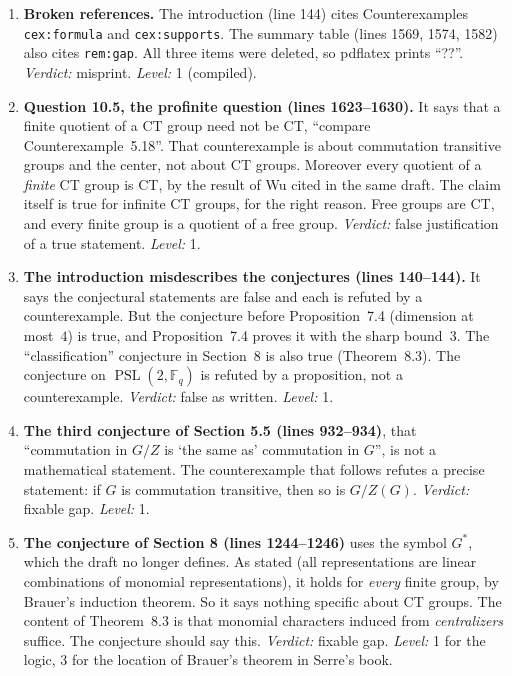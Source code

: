 \documentclass[12pt,letterpaper]{article}
\newcommand{\F}{\mathbb{F}}
\DeclareMathOperator{\PSL}{PSL}
\begin{document}
\begin{enumerate}[label=\textbf{C\arabic*.},leftmargin=*,itemsep=4pt]
\item \textbf{Broken references.} The introduction (line 144) cites
  Counterexamples \verb|cex:formula| and \verb|cex:supports|. The summary
  table (lines 1569, 1574, 1582) also cites \verb|rem:gap|. All three items
  were deleted, so pdflatex prints ``??''. \emph{Verdict:} misprint.
  \emph{Level:} 1 (compiled).

\item \textbf{Question 10.5, the profinite question (lines 1623--1630).} It
  says that a finite quotient of a CT group need not be CT, ``compare
  Counterexample~5.18''. That counterexample is about commutation transitive
  groups and the center, not about CT groups. Moreover every quotient of a
  \emph{finite} CT group is CT, by the result of Wu cited in the same draft.
  The claim itself is true for infinite CT groups, for the right reason.
  Free groups are CT, and every finite group is a quotient of a free group.
  \emph{Verdict:} false justification of a true statement. \emph{Level:} 1.

\item \textbf{The introduction misdescribes the conjectures (lines
  140--144).} It says the conjectural statements are false and each is
  refuted by a counterexample. But the conjecture before
  Proposition~7.4 (dimension at most~$4$) is true, and
  Proposition~7.4 proves it with the sharp bound~$3$. The ``classification''
  conjecture in Section~8 is also true (Theorem~8.3). The conjecture on
  $\PSL(2,\F_q)$ is refuted by a proposition, not a counterexample.
  \emph{Verdict:} false as written. \emph{Level:} 1.

\item \textbf{The third conjecture of Section 5.5 (lines 932--934)}, that
  ``commutation in $G/Z$ is `the same as' commutation in $G$'', is not a
  mathematical statement. The counterexample that follows refutes a precise
  statement: if $G$ is commutation transitive, then so is $G/Z(G)$.
  \emph{Verdict:} fixable gap. \emph{Level:} 1.

\item \textbf{The conjecture of Section 8 (lines 1244--1246)} uses the
  symbol $G^*$, which the draft no longer defines. As stated (all
  representations are linear combinations of monomial representations), it
  holds for \emph{every} finite group, by Brauer's induction theorem. So it
  says nothing specific about CT groups. The content of Theorem~8.3 is that
  monomial characters induced from \emph{centralizers} suffice. The
  conjecture should say this. \emph{Verdict:} fixable gap. \emph{Level:} 1
  for the logic, 3 for the location of Brauer's theorem in Serre's book.


\end{enumerate}
\end{document}
